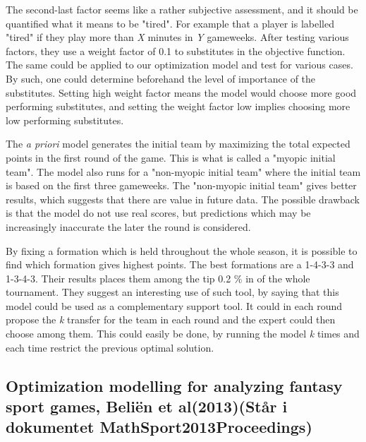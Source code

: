 The second-last factor seems like a rather subjective assessment, and it should be quantified what it means to be "tired". For example that a player is labelled "tired" if they play more than \textit{X} minutes in \textit{Y} gameweeks. After testing various factors, they use a weight factor of 0.1 to substitutes in the objective function. The same could be applied to our optimization model and test for various cases. By such, one could determine beforehand the level of importance of the substitutes. Setting high weight factor means the model would choose more good performing substitutes, and setting the weight factor low implies choosing more low performing substitutes.   

\newpar

The \textit{a priori} model generates the initial team by maximizing the total expected points in the first round of the game. This is what is called a "myopic initial team". The model also runs for a "non-myopic initial team" where the initial team is based on the first three gameweeks. The "non-myopic initial team" gives better results, which suggests that there are value in future data. The possible drawback is that the model do not use real scores, but predictions which may be increasingly inaccurate the later the round is considered. 

\newpar

By fixing a formation which is held throughout the whole season, it is possible to find which formation gives highest points. The best formations are a 1-4-3-3 and 1-3-4-3. Their results places them among the tip 0.2 \% in of the whole tournament. They suggest an interesting use of such tool, by saying that this model could be used as a complementary support tool. It could in each round propose the \textit{k} transfer for the team in each round and the expert could then choose among them. This could easily be done, by running the model \textit{k} times and each time restrict the previous optimal solution.  

\begin{comment}
De skriver hvilke formasjoner som er mulig å bruke. Det burde vi også gjøre. 
\end{comment}

\subsection{Optimization modelling for analyzing fantasy sport games, Beliën et al(2013)(Står i dokumentet MathSport2013Proceedings)}

